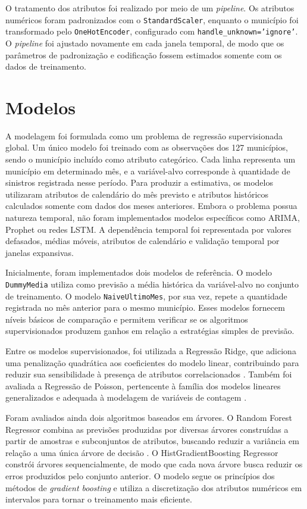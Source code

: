\documentclass[12pt]{article}
\begin{document}
O tratamento dos atributos foi realizado por meio de um \textit{pipeline}. Os atributos numéricos foram padronizados com o \texttt{StandardScaler}, enquanto o município foi transformado pelo \texttt{OneHotEncoder}, configurado com \texttt{handle\_unknown='ignore'}. O \textit{pipeline} foi ajustado novamente em cada janela temporal, de modo que os parâmetros de padronização e codificação fossem estimados somente com os dados de treinamento.

\section{Modelos}
\label{sec:modelos}

A modelagem foi formulada como um problema de regressão supervisionada global. Um único modelo foi treinado com as observações dos 127 municípios, sendo o município incluído como atributo categórico. Cada linha representa um município em determinado mês, e a variável-alvo corresponde à quantidade de sinistros registrada nesse período. Para produzir a estimativa, os modelos utilizaram atributos de calendário do mês previsto e atributos históricos calculados somente com dados dos meses anteriores.  Embora o problema possua natureza temporal, não foram implementados modelos específicos como ARIMA, Prophet ou redes LSTM. A dependência temporal foi representada por valores defasados, médias móveis, atributos de calendário e validação temporal por janelas expansivas.

Inicialmente, foram implementados dois modelos de referência. O modelo \texttt{DummyMedia} utiliza como previsão a média histórica da variável-alvo no conjunto de treinamento. O modelo \texttt{NaiveUltimoMes}, por sua vez, repete a quantidade registrada no mês anterior para o mesmo município. Esses modelos fornecem níveis básicos de comparação e permitem verificar se os algoritmos supervisionados produzem ganhos em relação a estratégias simples de previsão.

Entre os modelos supervisionados, foi utilizada a Regressão Ridge, que adiciona uma penalização quadrática aos coeficientes do modelo linear, contribuindo para reduzir sua sensibilidade à presença de atributos correlacionados \cite{hoerl1970ridge}. Também foi avaliada a Regressão de Poisson, pertencente à família dos modelos lineares generalizados e adequada à modelagem de variáveis de contagem \cite{nelder1972generalized}.

Foram avaliados ainda dois algoritmos baseados em árvores. O Random Forest Regressor combina as previsões produzidas por diversas árvores construídas a partir de amostras e subconjuntos de atributos, buscando reduzir a variância em relação a uma única árvore de decisão \cite{breiman2001random}. O HistGradientBoosting Regressor constrói árvores sequencialmente, de modo que cada nova árvore busca reduzir os erros produzidos pelo conjunto anterior. O modelo segue os princípios dos métodos de \textit{gradient boosting} \cite{friedman2001greedy} e utiliza a discretização dos atributos numéricos em intervalos para tornar o treinamento mais eficiente.
\end{document}
